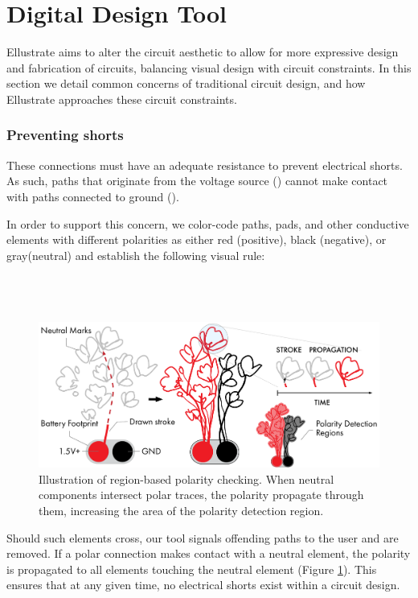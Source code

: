 \documentclass{sigchi}
\begin{document}
\section{Digital Design Tool}
    Ellustrate aims to alter the circuit aesthetic to allow for more expressive design and fabrication of circuits, balancing visual design with circuit constraints. In this section we detail common concerns of traditional circuit design, and how Ellustrate approaches these circuit constraints.

    \subsubsection{Preventing shorts}
    These connections must have an adequate resistance to prevent electrical shorts. As such, paths that originate from the voltage source () cannot make contact with paths connected to ground ().

    In order to support this concern, we color-code paths, pads, and other conductive elements with different polarities as either red (positive), black (negative), or gray(neutral) and establish the following visual rule:
    \\
    \\
    \noindent{}
    \\
    \\
\begin{figure}[h]
\centering
\includegraphics[width=1.0\columnwidth]{figures/propagation.pdf}
\caption{Illustration of region-based polarity checking. When neutral components intersect polar traces, the polarity propagate through them, increasing the area of the polarity detection region.}
\label{fig:propagation}
\end{figure}
    Should such elements cross, our tool signals offending paths to the user and are removed. If a polar connection makes contact with a neutral element, the polarity is propagated to all elements touching the neutral element (Figure \ref{fig:propagation}). This ensures that at any given time, no electrical shorts exist within a circuit design.
\end{document}
